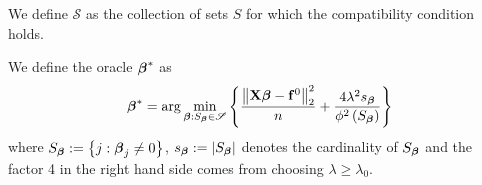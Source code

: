We define $\mathscr{S}$ as the collection of sets $S$ for which the compatibility condition holds.

\begin{definition}
    We define the oracle $\boldsymbol{\beta}^{*}$ as
    $$
        \boldsymbol{\beta}^{*} = \arg \min_{\boldsymbol{\beta}: S_{\boldsymbol{\beta}} \in \mathscr{S}} \left\{ \frac{ \left\| \mathbf{X} \boldsymbol{\beta} - \mathbf{f}^{0} \right\|_{2}^{2}}{n} + \frac{4 \lambda^{2} s_{\boldsymbol{\beta}}}{\phi^{2}\left(S_{\boldsymbol{\beta}}\right)}\right\}
    $$
    where $S_{\boldsymbol{\beta}}:=\left\{j: \boldsymbol{\beta}_{j} \neq 0\right\}$, $s_{\boldsymbol{\beta}}:=\left|S_{\boldsymbol{\beta}}\right|$ denotes the cardinality of $S_{\boldsymbol{\beta}}$ and the factor 4 in the right hand side comes from choosing $\lambda \geq \lambda_0$.
\end{definition}




